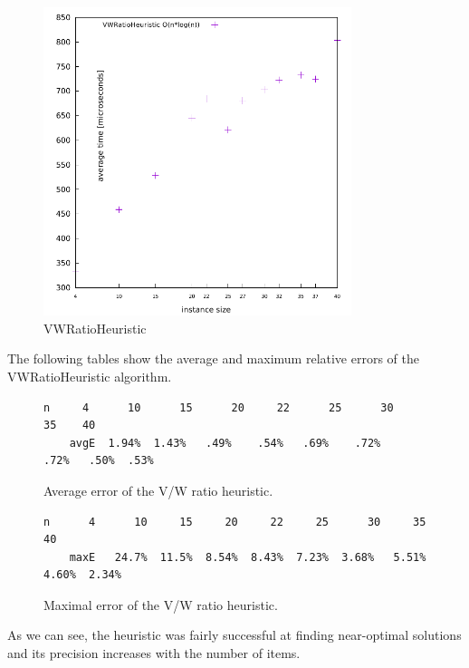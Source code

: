 \documentclass[a4paper,10pt,twocolumn]{article}
\begin{document}
\begin{figure}[H]
  \begin{center}
    \hspace*{-0.5cm}\includegraphics[width=9cm,height=9cm]{gnuplot/pdf/VWRatioHeuristic.pdf}
  \end{center}
  \caption{VWRatioHeuristic}\label{vwRatioHeuristicPlot}
\end{figure}

The following tables show the average and maximum relative errors of the VWRatioHeuristic algorithm.

\begin{figure}[H]
    \begin{lstlisting}[basicstyle=\scriptsize]
    n     4      10      15      20     22      25      30     35    40
    avgE  1.94%  1.43%   .49%    .54%   .69%    .72%    .72%   .50%  .53%
    \end{lstlisting}
    \caption{Average error of the V/W ratio heuristic.}\label{vwratioavgerr}
\end{figure}

\begin{figure}[H]
    \begin{lstlisting}[basicstyle=\scriptsize]
    n      4      10     15     20     22     25      30     35     40
    maxE   24.7%  11.5%  8.54%  8.43%  7.23%  3.68%   5.51%  4.60%  2.34%
    \end{lstlisting}
    \caption{Maximal error of the V/W ratio heuristic.}\label{vwratiomaxerr}
\end{figure}

As we can see, the heuristic was fairly successful at finding near-optimal solutions and its precision increases with
the number of items.
\end{document}

